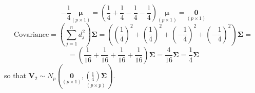 \begin{enumerate}[label= (\alph*)]
\[        -
        \frac{1}{4}
        \underset{(p \times 1)}{\bm{\mu}}
        =
        (\frac{1}{4}+\frac{1}{4}-\frac{1}{4}-\frac{1}{4})
        \underset{(p \times 1)}{\bm{\mu}}
        =
        \underset{(p \times 1)}{\textbf{0}}
    \]
    \[
        \text{Covariance}
        =
        \left(\sum_{j=1}^{n}{d_{j}^{2}}\right)\bm{\Sigma}
        =
        \left({\left(\frac{1}{4}\right)}^{2}+{\left(\frac{1}{4}\right)}^{2}+{\left(-\frac{1}{4}\right)}^{2}+{\left(-\frac{1}{4}\right)}^{2}\right)
        \bm{\Sigma}
        =
    \]
    \[
        =
        \left(
            \frac{1}{16}
            +
            \frac{1}{16}
            +
            \frac{1}{16}
            +
            \frac{1}{16}
        \right)
        \bm{\Sigma}
        =
        \frac{4}{16}
        \bm{\Sigma}
        =
        \frac{1}{4}
        \bm{\Sigma}
    \]
    so that $\textbf{V}_{2} \sim N_{p}\left(\underset{(p \times 1)}{\textbf{0}}, \underset{(p \times p)}{\left(\frac{1}{4}\right)\bm{\Sigma}}\right)$.


\end{enumerate}
